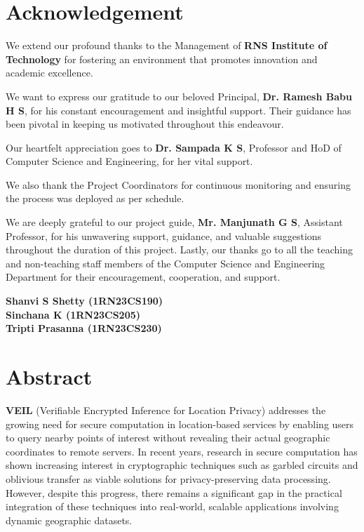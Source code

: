 \documentclass[12pt,a4paper,oneside]{report}
\begin{document}
\newpage
{}

\section*{Acknowledgement}
We extend our profound thanks to the Management of \textbf{RNS Institute of Technology} for fostering an environment that promotes innovation and academic excellence.

We want to express our gratitude to our beloved Principal, \textbf{Dr. Ramesh Babu H S}, for his constant encouragement and insightful support. Their guidance has been pivotal in keeping us motivated throughout this endeavour.

Our heartfelt appreciation goes to \textbf{Dr. Sampada K S}, Professor and HoD of Computer Science and Engineering, for her vital support.

We also thank the Project Coordinators for continuous monitoring and ensuring the process was deployed as per schedule.

We are deeply grateful to our project guide, \textbf{Mr. Manjunath G S}, Assistant Professor, for his unwavering support, guidance, and valuable suggestions throughout the duration of this project. Lastly, our thanks go to all the teaching and non-teaching staff members of the Computer Science and Engineering Department for their encouragement, cooperation, and support.

\vspace{1cm}
\noindent \textbf{Shanvi S Shetty (1RN23CS190)}\\
\textbf{Sinchana K (1RN23CS205)}\\
\textbf{Tripti Prasanna (1RN23CS230)}

\newpage
\section*{Abstract}
\textbf{VEIL} (Verifiable Encrypted Inference for Location Privacy) addresses the growing need for secure computation in location-based services by enabling users to query nearby points of interest without revealing their actual geographic coordinates to remote servers. In recent years, research in secure computation has shown increasing interest in cryptographic techniques such as garbled circuits and oblivious transfer as viable solutions for privacy-preserving data processing. However, despite this progress, there remains a significant gap in the practical integration of these techniques into real-world, scalable applications involving dynamic geographic datasets.
\end{document}
